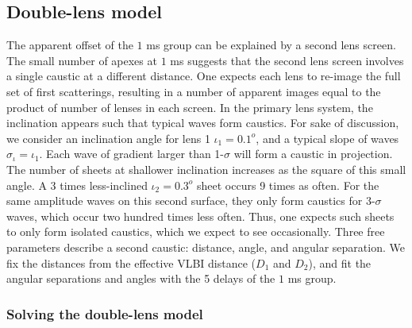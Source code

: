 \documentclass[useAMS,usenatbib]{mn2e}
\begin{document}
\subsection{Double-lens model}
\label{doublelensmodel}

The apparent offset of the $1$ ms group can be explained by a second lens
screen.  The small number of apexes at $1$ ms suggests that the second
lens screen involves a single caustic at a different distance.  One
expects each lens to re-image the full set of first scatterings,
resulting in a number of apparent images equal to the product of
number of lenses in each screen.
In the
primary lens system, the inclination appears such that typical waves
form caustics.  For sake of discussion, we consider an inclination
angle for lens 1 $\iota_1 = 0.1^o$, and a typical slope of waves
$\sigma_\iota = \iota_1$.   Each wave of gradient larger than
1-$\sigma$ will form a caustic in projection. 
The number of sheets at shallower inclination
increases as the square of this small angle.  A 3 times less-inclined $\iota_2=0.3^o$
sheet occurs 9 times as often.  For the same amplitude waves on this
second surface, they only form
caustics for 3-$\sigma$ waves, which occur two hundred times less
often.  Thus, one expects such sheets to only form isolated caustics,
which we expect to see occasionally.  Three free parameters describe a
second caustic: distance, angle, and angular separation.  We fix the
distances from the effective VLBI distance ($D_1$ and $D_2$), and fit the angular
separations and angles with the 5 delays of the $1$ ms group.

\subsubsection{Solving the double-lens model}
\end{document}
